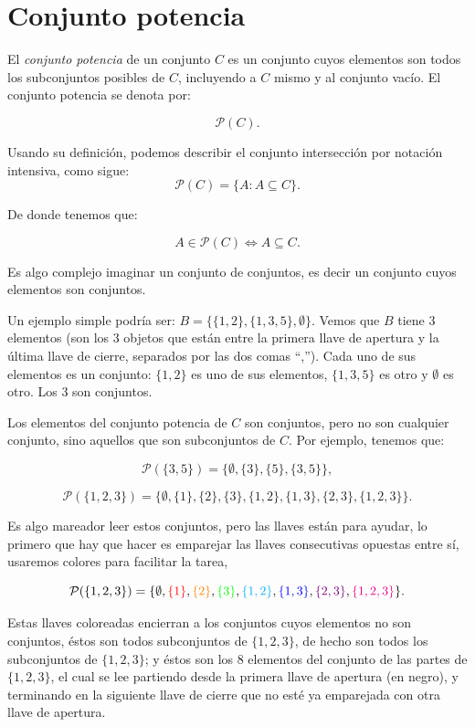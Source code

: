 \section{Conjunto potencia}

El {\em conjunto  potencia} de un conjunto $C$ es 
un conjunto cuyos elementos son todos los subconjuntos posibles de  
$C$, incluyendo a $C$ mismo y al conjunto vacío.
El conjunto potencia se denota por:

$$\mathcal{P}(C).$$

Usando su definición, podemos describir 
el conjunto intersección por notación intensiva, como sigue:
\[\mathcal{P}(C)=\{A: A\subseteq C\}.\]

De donde tenemos que:

$$A\in \mathcal{P}(C) \Leftrightarrow A\subseteq C.$$

Es algo complejo imaginar un conjunto de conjuntos, 
es decir un conjunto cuyos elementos son conjuntos.

Un ejemplo simple podría ser:  $B=\{ \{1,2\},\{1,3,5\},\emptyset\}$. 
Vemos que $B$ tiene 3 elementos (son los 3 objetos que están entre la primera 
llave de apertura y la última llave de cierre, 
separados por las dos comas ``,'').
Cada uno de sus elementos es un conjunto: 
$\{1,2\}$ es uno de sus elementos, $\{1,3,5\}$ es otro y $\emptyset$ es otro.
Los 3 son conjuntos.

Los elementos del conjunto potencia de $C$ 
son conjuntos, pero no son cualquier conjunto, sino
aquellos que son subconjuntos de $C$. 
Por ejemplo, tenemos que:

$$\mathcal{P}(\{3,5\})=  \{ \emptyset, \{3\},\{5\},\{3,5\}\},$$

$$\mathcal{P}(\{1,2,3\})=  \{\emptyset,
\{1\},\{2\},\{3\},\{1,2\},\{1,3\},
\{2,3\},\{1,2,3\}\}.$$

Es algo mareador leer estos conjuntos, pero las llaves están para ayudar, 
lo primero que hay que hacer es emparejar 
las llaves consecutivas opuestas entre sí, 
usaremos colores para facilitar la tarea,

$$\mathcal{P}(\{1,2,3\})=  \{\emptyset, \color{red}{\{1\}}\color{black},
\color{orange}{\{2\}}\color{black},
\color{green}{\{3\}}\color{black},
\color{cyan}{\{1,2\}}\color{black},
\color{blue}{\{1,3\}}\color{black},
\color{violet}{\{2,3\}}\color{black},
\color{magenta}{\{1,2,3\}}\color{black}{\}}.$$

Estas llaves coloreadas encierran a los conjuntos 
cuyos elementos no son conjuntos, \'estos son todos 
subconjuntos de $\{1,2,3\}$, 
de hecho son todos los subconjuntos de $\{1,2,3\}$; 
y \'estos son los 8 elementos del conjunto de las partes de 
$\{1,2,3\}$, el cual se lee partiendo desde la primera 
llave de apertura (en negro), y terminando en la siguiente 
llave de cierre que no esté 
ya emparejada con otra llave de apertura.

